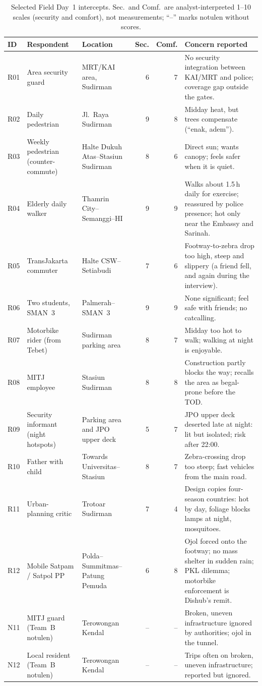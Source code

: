 \documentclass[11pt,a4paper]{article}
\begin{document}
\begin{table}[H]
\centering
\small
\caption{Selected Field Day~1 intercepts. Sec.\ and Comf.\ are analyst-interpreted 1--10 scales
(security and comfort), not measurements; ``--'' marks notulen without scores.}
\label{tab:intercepts}
\renewcommand{\arraystretch}{1.15}
\begin{tabularx}{\textwidth}{@{}l P{2.9cm} P{2.9cm} r r Y@{}}
\toprule
\textbf{ID} & \textbf{Respondent} & \textbf{Location} & \textbf{Sec.} & \textbf{Comf.} & \textbf{Concern reported} \\
\midrule
R01 & Area security guard & MRT/KAI area, Sudirman & 6 & 7 & No security integration between KAI/MRT and police; coverage gap outside the gates. \\
R02 & Daily pedestrian & Jl.\ Raya Sudirman & 9 & 8 & Midday heat, but trees compensate (``enak, adem''). \\
R03 & Weekly pedestrian (counter-commute) & Halte Dukuh Atas--Stasiun Sudirman & 8 & 6 & Direct sun; wants canopy; feels safer when it is quiet. \\
R04 & Elderly daily walker & Thamrin City--Semanggi--HI & 9 & 9 & Walks about 1.5\,h daily for exercise; reassured by police presence; hot only near the Embassy and Sarinah. \\
R05 & TransJakarta commuter & Halte CSW--Setiabudi & 7 & 6 & Footway-to-zebra drop too high, steep and slippery (a friend fell, and again during the interview). \\
R06 & Two students, SMAN~3 & Palmerah--SMAN~3 & 9 & 9 & None significant; feel safe with friends; no catcalling. \\
R07 & Motorbike rider (from Tebet) & Sudirman parking area & 8 & 7 & Midday too hot to walk; walking at night is enjoyable. \\
R08 & MITJ employee & Stasiun Sudirman & 8 & 8 & Construction partly blocks the way; recalls the area as begal-prone before the TOD. \\
R09 & Security informant (night hotspots) & Parking area and JPO upper deck & 5 & 7 & JPO upper deck deserted late at night: lit but isolated; risk after 22:00. \\
R10 & Father with child & Towards Universitas--Stasiun & 8 & 7 & Zebra-crossing drop too steep; fast vehicles from the main road. \\
R11 & Urban-planning critic & Trotoar Sudirman & 7 & 4 & Design copies four-season countries: hot by day, foliage blocks lamps at night, mosquitoes. \\
R12 & Mobile Satpam / Satpol PP & Polda--Summitmas--Patung Pemuda & 6 & 8 & Ojol forced onto the footway; no mass shelter in sudden rain; PKL dilemma; motorbike enforcement is Dishub's remit. \\
N11 & MITJ guard (Team~B notulen) & Terowongan Kendal & -- & -- & Broken, uneven infrastructure ignored by authorities; ojol in the tunnel. \\
N12 & Local resident (Team~B notulen) & Terowongan Kendal & -- & -- & Trips often on broken, uneven infrastructure; reported but ignored. \\
\bottomrule
\end{tabularx}
\end{table}
\end{document}
